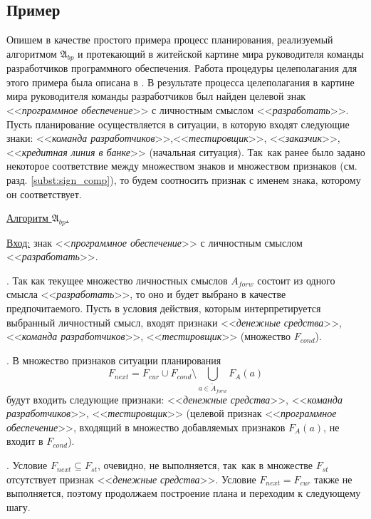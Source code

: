 \documentclass[a4paper, 12pt]{article}
\numberwithin{equation}{section}
\begin{document}
	\subsection{Пример} Опишем в качестве простого примера процесс планирования, реализуемый алгоритмом $\mathfrak A_{bp}$ и протекающий в житейской картине мира руководителя команды разработчиков программного обеспечения. Работа процедуры целеполагания для этого примера была описана в \cite{PanovA2014a}. В результате процесса целеполагания в картине мира руководителя команды разработчиков был найден целевой знак <<\textit{программное обеспечение}>> с личностным смыслом <<\textit{разработать}>>. Пусть планирование осуществляется в ситуации, в которую входят следующие знаки: <<\textit{команда разработчиков}>>,<<\textit{тестировщик}>>, <<\textit{заказчик}>>, <<\textit{кредитная линия в банке}>> (начальная ситуация). Так~как ранее было задано некоторое соответствие между множеством знаков и множеством признаков (см. разд. \ref{subst:sign_comp}), то будем соотносить признак с именем знака, которому он соответствует.
	
	\underline{Алгоритм $\mathfrak A_{bp}$.}
	
	\underline{Вход:} знак <<\textit{программное обеспечение}>> с личностным смыслом <<\textit{разработать}>>.

	. Так как текущее множество личностных смыслов $A_{forw}$ состоит из одного смысла <<\textit{разработать}>>, то оно и будет выбрано в качестве предпочитаемого. Пусть в условия действия, которым интерпретируется выбранный личностный смысл, входят признаки <<\textit{денежные средства}>>, <<\textit{команда разработчиков}>>, <<\textit{тестировщик}>> (множество $F_{cond}$).
	
	. В множество признаков ситуации планирования
	\begin{equation*}
		F_{next}=F_{cur}\cup F_{cond}\setminus\bigcup\limits_{a\in \tilde A_{forw}}F_A(a)
	\end{equation*}
	 будут входить следующие признаки: <<\textit{денежные средства}>>, <<\textit{команда разработчиков}>>, <<\textit{тестировщик}>> (целевой признак <<\textit{программное обеспечение}>>, входящий в множество добавляемых признаков $F_A(a)$, не входит в $F_{cond}$).
	
	. Условие $F_{next}\subseteq F_{st}$, очевидно, не выполняется, так~как в множестве $F_{st}$ отсутствует признак <<\textit{денежные средства}>>. Условие $F_{next}=F_{cur}$ также не выполняется, поэтому продолжаем построение плана и переходим к следующему шагу.
	
\end{document}
